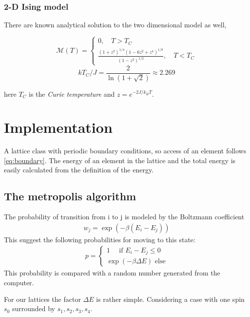 \documentclass[11pt,a4paper,english]{article}
\numberwithin{equation}{section}
\newcommand{\magM}{\mathcal{M}}
\begin{document}
\subsubsection{2-D Ising model}
There are known analytical solution to the two dimensional model as well, 

\begin{equation}
\magM (T) = \begin{cases} 0, \quad T > T_C \\ \frac{(1+z^2)^{1/4} (1-6z^2 + z^4 )^{1/8} }{(1-z^2)^{1/2}}, \quad T < T_C \end{cases}
\end{equation}
\begin{equation}
k T_C/J = \frac{2}{\ln(1+ \sqrt{2}) } \approx 2.269
\end{equation}

here $T_C$ is the \emph{Curie temperature} and $z = e^{-2J/k_B T}$. 

\section{Implementation}

A lattice class with periodic boundary conditions, so access of an
element follows \eqref{eq:boundary}. The energy of an element in the 
lattice and the total energy is easily calculated from the definition
of the energy. 

\subsection{The metropolis algorithm}

The probability of transition from i to j 
is modeled by the Boltzmann coefficient
\begin{gather}
w_j = \exp(-\beta (E_i - E_j))
\end{gather}
This suggest the following probabilities for moving to this state:
\begin{gather}
p = \begin{cases}
1 \quad\text{ if }  E_i - E_j \le 0\\
\exp(-\beta \Delta E) \text{ else}
\end{cases}
\label{eq:transition}
\end{gather}
This probability is compared with a random number generated from 
the computer.

For our lattices the factor $\Delta E$ is rather simple. Considering 
a case with one spin $s_0$ surrounded by $s_1,s_2,s_3, s_4$. 
\end{document}
